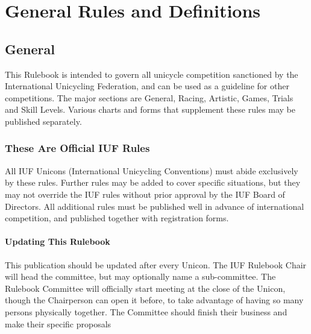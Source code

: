 \chapter{General Rules and Definitions}
\section{General}
This Rulebook is intended to govern all unicycle competition sanctioned by the International Unicycling Federation, and can be used as a guideline for other competitions. The major sections are General, Racing, Artistic, Games, Trials and Skill Levels. Various charts and forms that supplement these rules may be published separately.

\subsection{These Are Official IUF Rules}
All IUF Unicons (International Unicycling Conventions) must abide exclusively by these rules. Further rules may be added to cover specific situations, but they may not override the IUF rules without prior approval by the IUF Board of Directors. All additional rules must be published well in advance of international competition, and published together with registration forms.

\subsubsection{Updating This Rulebook}
This publication should be updated after every Unicon. The IUF Rulebook Chair will head the committee, but may optionally name a sub-committee. The Rulebook Committee will officially start meeting at the close of the Unicon, though the Chairperson can open it before, to take advantage of having so many persons physically together. The Committee should finish their business and make their specific proposals 


